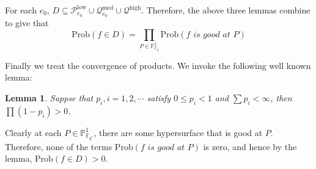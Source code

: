 \documentclass[12pt]{article}
\theoremstyle{plain}
\newtheorem{lemma}[equation]{Lemma}
\theoremstyle{definition}
\newcommand{\sP}{\mathcal{P}}
\newcommand{\IF}{\mathbb{F}}
\newcommand{\IP}{\mathbb{P}}
\newcommand{\<}{\langle}
\renewcommand{\>}{\rangle}
\newcommand{\sQ}{\mathcal{Q}}
\newcommand{\Prob}{\mathrm{Prob}}
\begin{document}
For each $e_0$, $D \subseteq \sP_{e_0}^{\mathrm{low}} \cup \sQ_{e_0}^{\mathrm{med}} \cup \sQ^{\mathrm{high}}$. Therefore, the above three lemmas combine to give that 
$$ \Prob(f \in D) = \prod_{P \in \IP^1_{\IF_q}} \Prob(f \textit{ is good at }P) $$

Finally we treat the convergence of products. We invoke the following well known lemma:
\begin{lemma}
Suppse that $p_i, i = 1, 2, \cdots$ satisfy $0 \le p_i < 1$ and $\sum p_i < \infty$, then $\prod (1 - p_i) > 0$. 
\end{lemma}

Clearly at each $P \in \IP^1_{\IF_{q^e}}$, there are some hypersurface that is good at $P$. Therefore, none of the terms $\Prob(f \textit{ is good at }P)$ is zero, and hence by the lemma, $ \Prob(f \in D) > 0 $.
\end{document}

